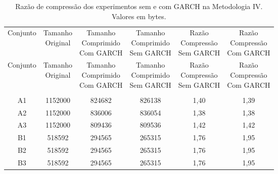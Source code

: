 \begin{center}
\begin{longtable}{cccccc}
\toprule
\rowcolor{white}
\caption[Metodologia IV: Razão de compressão]{Razão de compressão dos
experimentos sem e com GARCH na Metodologia IV.
Valores em bytes.} \label{Tab:razaocompressaoMet4} \\
\midrule
Conjunto & \specialcell{Tamanho \\Original} & \specialcell{Tamanho
\\Comprimido\\Com GARCH} & \specialcell{Tamanho
\\Comprimido\\Sem GARCH} & \specialcell{Razão \\Compressão
\\Sem GARCH} & \specialcell{Razão \\Compressão
\\Com GARCH} \\
\midrule
\endfirsthead
\midrule
\rowcolor{white}
Conjunto & \specialcell{Tamanho \\Original} & \specialcell{Tamanho
\\Comprimido\\Com GARCH} & \specialcell{Tamanho
\\Comprimido\\Sem GARCH} & \specialcell{Razão \\Compressão
\\Sem GARCH} & \specialcell{Razão \\Compressão
\\Com GARCH} \\
\toprule
\endhead
\midrule \\ %
\endfoot
\bottomrule
\endlastfoot
    A1    & 1152000 & 824682 & 826138 & 1,40  & 1,39 \\
    A2    & 1152000 & 836006 & 836054 & 1,38  & 1,38 \\
    A3    & 1152000 & 809436 & 809536 & 1,42  & 1,42 \\
    B1    & 518592 & 294565 & 265315 & 1,76  & 1,95 \\
    B2    & 518592 & 294565 & 265315 & 1,76  & 1,95 \\
    B3    & 518592 & 294565 & 265315 & 1,76  & 1,95 \\

\end{longtable}
\end{center}
